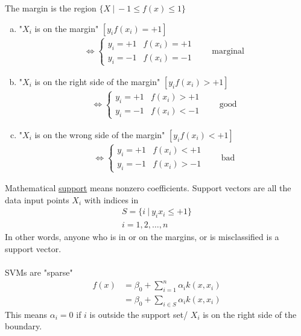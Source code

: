 \documentclass[12pt, letterpaper]{article}
\begin{document}
The margin is the region $\{X\ |\ -1 \le f(x) \le 1\}$
\begin{enumerate}[(a)]
    \item "$X_i$ is on the margin" $[y_if(x_i) = +1]$
    \begin{align*}
        \Leftrightarrow \begin{cases}
            y_i = + 1 & f(x_i) = +1 \\
            y_i = - 1 & f(x_i) = -1
        \end{cases}\qquad \boxed{\text{marginal}}
    \end{align*}
    \item "$X_i$ is on the right side of the margin" $[y_if(x_i) > +1]$
    \begin{align*}
        \Leftrightarrow \begin{cases}
            y_i = + 1 & f(x_i) > +1 \\
            y_i = - 1 & f(x_i) < -1
        \end{cases}\qquad \boxed{\text{good}}
    \end{align*}
    \item "$X_i$ is on the wrong side of the margin" $[y_if(x_i) < +1]$
    \begin{align*}
        \Leftrightarrow \begin{cases}
            y_i = + 1 & f(x_i) < +1 \\
            y_i = - 1 & f(x_i) > -1
        \end{cases}\qquad \boxed{\text{bad}}
    \end{align*}
\end{enumerate}
Mathematical \underline{support} means nonzero coefficients. Support vectors are 
all the data input points $X_i$ with indices in 
\begin{align*}
    S = \{i\ |\ y_ix_i \le +1\} \\
    i = 1,2,\dots,n
\end{align*}
In other words, anyone who is in or on the margins, or is misclassified is a support
vector. \\ \\
SVMs are "sparse" 
\begin{align*}
    f(x) &= \beta_0 + \sum_{i=1}^{n} \alpha_i k(x, x_i) \\
    &= \beta_0 +\sum_{i \in S} \alpha_i k(x,x_i) 
\end{align*}
This means $\alpha_i = 0$ if $i$ is outside the support set/ $X_i$ is on the right 
side of the boundary.
\end{document}
